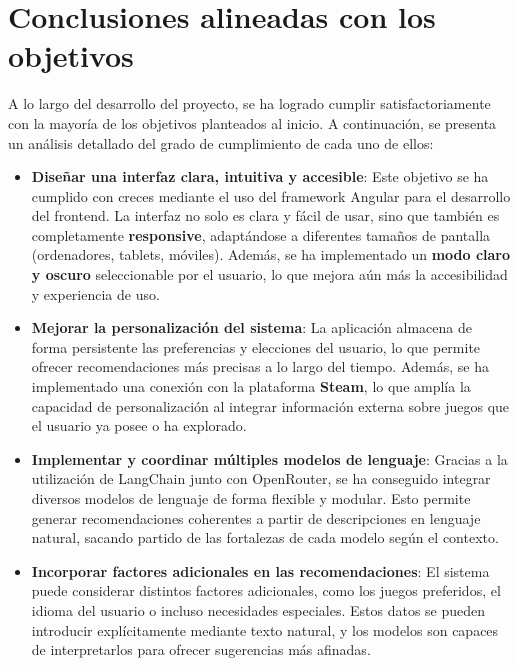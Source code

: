 \section{Conclusiones alineadas con los objetivos}

A lo largo del desarrollo del proyecto, se ha logrado cumplir satisfactoriamente con la mayoría de los objetivos planteados al inicio. A continuación, se presenta un análisis detallado del grado de cumplimiento de cada uno de ellos:

\begin{itemize}
	
	\item \textbf{Diseñar una interfaz clara, intuitiva y accesible}:
	Este objetivo se ha cumplido con creces mediante el uso del framework Angular para el desarrollo del frontend. La interfaz no solo es clara y fácil de usar, sino que también es completamente \textbf{responsive}, adaptándose a diferentes tamaños de pantalla (ordenadores, tablets, móviles). Además, se ha implementado un \textbf{modo claro y oscuro} seleccionable por el usuario, lo que mejora aún más la accesibilidad y experiencia de uso.
	
	\item \textbf{Mejorar la personalización del sistema}:
	La aplicación almacena de forma persistente las preferencias y elecciones del usuario, lo que permite ofrecer recomendaciones más precisas a lo largo del tiempo. Además, se ha implementado una conexión con la plataforma \textbf{Steam}, lo que amplía la capacidad de personalización al integrar información externa sobre juegos que el usuario ya posee o ha explorado.
	
	\item \textbf{Implementar y coordinar múltiples modelos de lenguaje}:
	Gracias a la utilización de LangChain junto con OpenRouter, se ha conseguido integrar diversos modelos de lenguaje de forma flexible y modular. Esto permite generar recomendaciones coherentes a partir de descripciones en lenguaje natural, sacando partido de las fortalezas de cada modelo según el contexto.
	
	\item \textbf{Incorporar factores adicionales en las recomendaciones}:
	El sistema puede considerar distintos factores adicionales, como los juegos preferidos, el idioma del usuario o incluso necesidades especiales. Estos datos se pueden introducir explícitamente mediante texto natural, y los modelos son capaces de interpretarlos para ofrecer sugerencias más afinadas.
	

\end{itemize}
